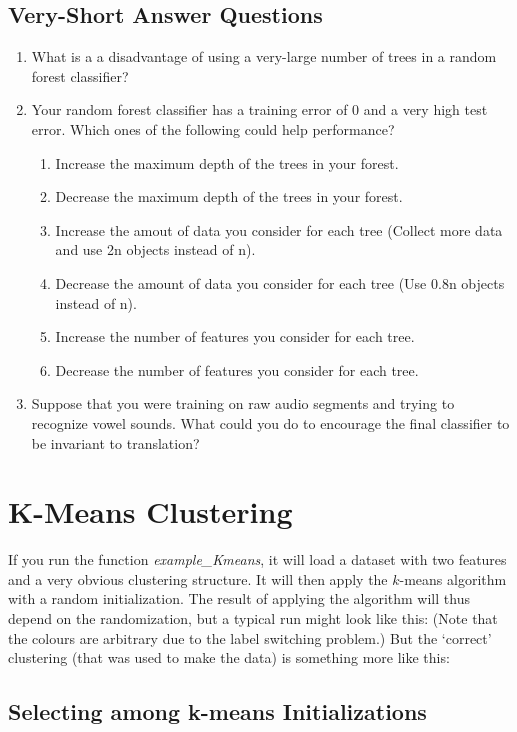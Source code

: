 \documentclass{article}
\def\blu#1{{\color{blu}#1}}
\newcommand{\centerfig}[2]{\begin{center}\texttt{[image: a2f/\#2]}\end{center}}
\def\enum#1{\begin{enumerate}#1\end{enumerate}}
\begin{document}
\subsection{Very-Short Answer Questions}

\blu{\enum{
\item What is a a disadvantage of using a very-large number of trees in a random forest classifier?
\item Your random forest classifier has a training error of 0 and a very high test error. Which ones of the following could help performance?
\enum{
\item Increase the maximum depth of the trees in your forest.
\item Decrease the maximum depth of the trees in your forest.
\item Increase the amout of data you consider for each tree (Collect more data and use 2n objects instead of n).
\item Decrease the amount of data you consider for each tree (Use 0.8n objects instead of n).
\item Increase the number of features you consider for each tree.
\item Decrease the number of features you consider for each tree.
}
\item Suppose that you were training on raw audio segments and trying to recognize vowel sounds. What could you do to encourage the final classifier to be invariant to translation?
}
}

\section{K-Means Clustering}

If you run the function \emph{example\_Kmeans}, it will load a dataset with two features and a very obvious clustering structure. It will then apply the $k$-means algorithm with a random initialization. The result of applying the algorithm will thus depend on the randomization, but a typical run might look like this:
(Note that the colours are arbitrary due to the label switching problem.)
But the `correct' clustering (that was used to make the data) is something more like this:

\subsection{Selecting among k-means Initializations}
\end{document}
